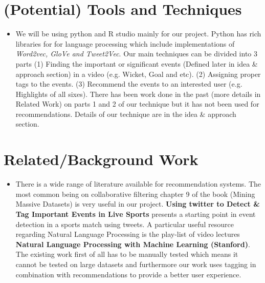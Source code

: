 \documentclass[11pt]{article}
\begin{document}
\section{(Potential) Tools and Techniques}
\begin{itemize}
\item We will be using python and R studio mainly for our project. Python has rich libraries for for language processing which include implementations of \textit{Word2vec, GloVe and Tweet2Vec}. Our main techniques can be divided into 3 parts (1) Finding the important or significant events (Defined later in idea \& approach section) in a video (e.g. Wicket, Goal and etc). (2) Assigning proper tags to the events. (3) Recommend the events to an interested user (e.g. Highlights of all sixes). There has been work done in the past (more details in Related Work) on parts 1 and 2 of our technique but it has not been used for recommendations. Details of our technique are in the idea \& approach section.
\end{itemize}

\section{Related/Background Work}
\begin{itemize}
\item There is a wide range of literature available for recommendation systems. The most common being on collaborative filtering chapter 9 of the book (Mining Massive Datasets) is very useful in our project. \textbf{Using twitter to Detect \& Tag Important Events in Live Sports} presents a starting point in event detection in a sports match using tweets.
A particular useful resource regarding Natural Language Processing is the play-list of video lectures \textbf{Natural Language Processing with Machine Learning (Stanford)}. The existing work first of all has to be manually tested which means it cannot be tested on large datasets and furthermore our work uses tagging in combination with recommendations to provide a better user experience.
\end{itemize}
\end{document}
